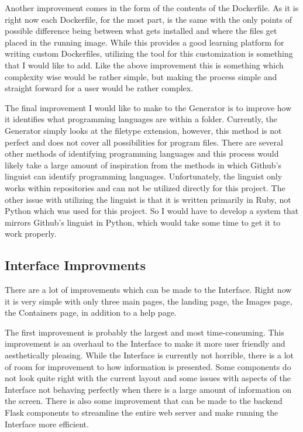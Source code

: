 Another improvement comes in the form of the contents of the Dockerfile. As it is right now each Dockerfile, for the most part, is the same with the only points of possible difference being between what gets installed and where the files get placed in the running image. While this provides a good learning platform for writing custom Dockerfiles, utilizing the tool for this customization is something that I would like to add. Like the above improvement this is something which complexity wise would be rather simple, but making the process simple and straight forward for a user would be rather complex.

The final improvement I would like to make to the Generator is to improve how it identifies what programming languages are within a folder. Currently, the Generator simply looks at the filetype extension, however, this method is not perfect and does not cover all possibilities for program files. There are several other methods of identifying programming languages and this process would likely take a large amount of inspiration from the methods in which Github's linguist can identify programming languages. Unfortunately, the linguist only works within repositories and can not be utilized directly for this project. The other issue with utilizing the linguist is that it is written primarily in Ruby, not Python which was used for this project. So I would have to develop a system that mirrors Github's linguist in Python, which would take some time to get it to work properly.

\subsection{Interface Improvments}
\label{sec:interfaceImprove}

There are a lot of improvements which can be made to the Interface. Right now it is very simple with only three main pages, the landing page, the Images page, the Containers page, in addition to a help page.

The first improvement is probably the largest and most time-consuming. This improvement is an overhaul to the Interface to make it more user friendly and aesthetically pleasing. While the Interface is currently not horrible, there is a lot of room for improvement to how information is presented. Some components do not look quite right with the current layout and some issues with aspects of the Interface not behaving perfectly when there is a large amount of information on the screen. There is also some improvement that can be made to the backend Flask components to streamline the entire web server and make running the Interface more efficient.

